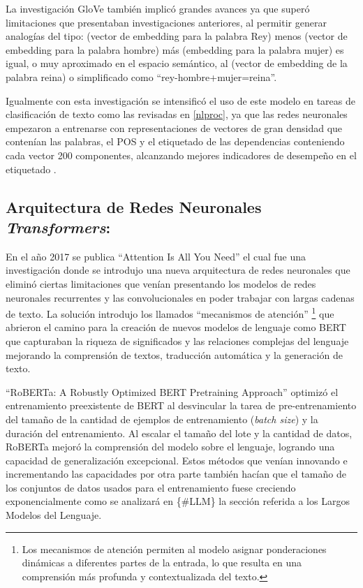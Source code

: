 \documentclass[
  10,
  openany]{book}
\begin{document}
La investigación GloVe \citep{pennington2014} también implicó grandes avances ya que superó limitaciones que presentaban investigaciones anteriores, al permitir generar analogías del tipo: (vector de embedding para la palabra Rey) menos (vector de embedding para la palabra hombre) más (embedding para la palabra mujer) es igual, o muy aproximado en el espacio semántico, al (vector de embedding de la palabra reina) o simplificado como ``rey-hombre+mujer=reina''.

Igualmente con esta investigación se intensificó el uso de este modelo en tareas de clasificación de texto como las revisadas en \ref{nlproc}, ya que las redes neuronales empezaron a entrenarse con representaciones de vectores de gran densidad que contenían las palabras, el POS y el etiquetado de las dependencias conteniendo cada vector 200 componentes, alcanzando mejores indicadores de desempeño en el etiquetado \citep{chen2014}.

\hypertarget{trans}{%
\subsection{\texorpdfstring{Arquitectura de Redes Neuronales \emph{Transformers}:}{Arquitectura de Redes Neuronales Transformers:}}\label{trans}}

En el año 2017 se publica ``Attention Is All You Need'' \citep{vaswani2017} el cual fue una investigación donde se introdujo una nueva arquitectura de redes neuronales que eliminó ciertas limitaciones que venían presentando los modelos de redes neuronales recurrentes y las convolucionales en poder trabajar con largas cadenas de texto. La solución introdujo los llamados ``mecanismos de atención'' \footnote{Los mecanismos de atención permiten al modelo asignar ponderaciones dinámicas a diferentes partes de la entrada, lo que resulta en una comprensión más profunda y contextualizada del texto.} que abrieron el camino para la creación de nuevos modelos de lenguaje como BERT \citep{devlin2018} que capturaban la riqueza de significados y las relaciones complejas del lenguaje mejorando la comprensión de textos, traducción automática y la generación de texto.

``RoBERTa: A Robustly Optimized BERT Pretraining Approach'' \citep{liu2019} optimizó el entrenamiento preexistente de BERT al desvincular la tarea de pre-entrenamiento del tamaño de la cantidad de ejemplos de entrenamiento (\emph{batch size}) y la duración del entrenamiento. Al escalar el tamaño del lote y la cantidad de datos, RoBERTa mejoró la comprensión del modelo sobre el lenguaje, logrando una capacidad de generalización excepcional. Estos métodos que venían innovando e incrementando las capacidades por otra parte también hacían que el tamaño de los conjuntos de datos usados para el entrenamiento fuese creciendo exponencialmente como se analizará en \{\#LLM\} la sección referida a los Largos Modelos del Lenguaje.
\end{document}
